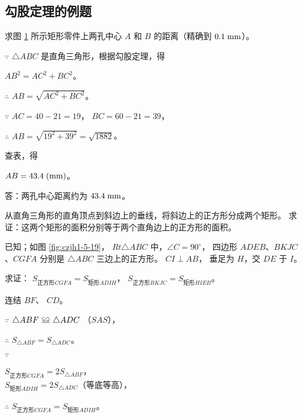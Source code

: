 \subsection{勾股定理的例题}\label{subsec:czjh1-5-4}

\liti 求图 \ref{fig:czjh1-5-18} 所示矩形零件上两孔中心 $A$ 和 $B$ 的距离（精确到 $0.1\;\mathord{\text{mm}}$）。

\begin{figure}[htbp]
    \centering
    
    \caption{}\label{fig:czjh1-5-18}
\end{figure}

\jie $\because$ \quad $\triangle ABC$ 是直角三角形，根据勾股定理，得

\qquad $AB^2 = AC^2 + BC^2$。

$\therefore$ \quad $AB = \sqrt{AC^2 + BC^2}$。

$\because$ \quad $AC = 40 - 21 = 19$， $BC = 60 - 21 = 39$，

$\therefore$ \quad $AB = \sqrt{19^2 + 39^2} = \sqrt{1882}$。

查表，得

\qquad $AB = 43.4 \; (\mathord{\text{mm}})$。

答：两孔中心距离约为 $43.4 \;\mathord{\text{mm}}$。


\liti 从直角三角形的直角顶点到斜边上的垂线，将斜边上的正方形分成两个矩形。
求证：这两个矩形的面积分别等于两个直角边上的正方形的面积。

已知；如图 \ref{fig:czjh1-5-19}， $Rt \triangle ABC$ 中，$\angle C = 90^\circ$，
四边形 $ADEB$、$BKJC$、$CGFA$ 分别是 $\triangle ABC$ 三边上的正方形。
$CI \perp AB$， 垂足为 $H$，交 $DE$ 于 $I$。

求证： $S_{\text{正方形} CGFA} = S_{\text{矩形} ADIH}$， $S_{\text{正方形} BKJC} = S_{\text{矩形} HIEB}$。

\zhengming 连结 $BF$、 $CD$。

$\because$ \quad $\triangle ABF \quandeng \triangle ADC$ （$SAS$），

$\therefore$ \quad $S_{\triangle ABF} = S_{\triangle ADC}$。

$\because$ \quad \begin{zmtblr}[t]{}
    $S_{\text{正方形} CGFA} = 2 S_{\triangle ABF}$， \\
    $S_{\text{矩形} ADIH} = 2 S_{\triangle ADC}$（等底等高）， \\
\end{zmtblr}

$\therefore$ \quad $S_{\text{正方形} CGFA} = S_{\text{矩形} ADIH}$。

